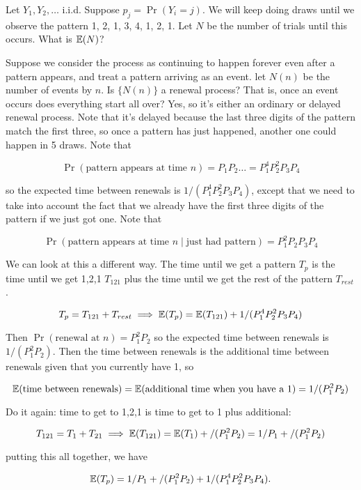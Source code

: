 \begin{example} Let \(Y_1, Y_2, \ldots\) i.i.d. Suppose \(p_j = \Pr(Y_i = j)\). We will keep doing draws until we observe the pattern 1, 2, 1, 3, 4, 1, 2, 1. Let \(N\) be the number of trials until this occurs. What is \(\E(N)\)?

\begin{solution} Suppose we consider the process as continuing to happen forever even after a pattern appears, and treat a pattern arriving as an event. let \(N(n)\) be the number of events by \(n\). Is \(\{N(n)\}\) a renewal process? That is, once an event occurs does everything start all over? Yes, so it's either an ordinary or delayed renewal process. Note that it's delayed because the last three digits of the pattern match the first three, so once a pattern has just happened, another one could happen in 5 draws. Note that

\[
\Pr(\text{pattern appears at time } n) = P_1 P_2 \ldots = P_1^4P_2^2 P_3 P_4
\]

so the expected time between renewals is \(1/(P_1^4P_2^2 P_3 P_4) \), except that we need to take into account the fact that we already have the first three digits of the pattern if we just got one. Note that

\[
\Pr(\text{pattern appears at time } n \mid \text{just had pattern}) = P_1^2P_2 P_3 P_4
\]

We can look at this a different way. The time until we get a pattern \(T_p\) is the time until we get 1,2,1 \(T_{121}\) plus the time until we get the rest of the pattern \(T_{rest}\).

\[
T_p = T_{121} + T_{rest} \implies \E(T_p) = \E( T_{121}) + 1/(P_1^4P_2^2 P_3 P_4)
\]

Then \(\Pr(\text{renewal at }n) = P_1^2 P_2\) so the expected time between renewals is \(1/( P_1^2 P_2)\). Then the time between renewals is the additional time between renewals given that you currently have 1, so

\[
\E(\text{time between renewals}) = \E(\text{additional time when you have a } 1) = 1/(P_1^2 P_2)
\]

Do it again: time to get to 1,2,1 is time to get to 1 plus additional:

\[
T_{121} = T_{1} + T_{21} \implies \E(T_{121}) = \E( T_{1}) + /(P_1^2 P_2) = 1/P_1 + /(P_1^2 P_2)
\]

putting this all together, we have

\[
\E(T_p) = 1/P_1 + /(P_1^2 P_2) + 1/(P_1^4P_2^2 P_3 P_4).
\]

\end{solution}

\end{example}

